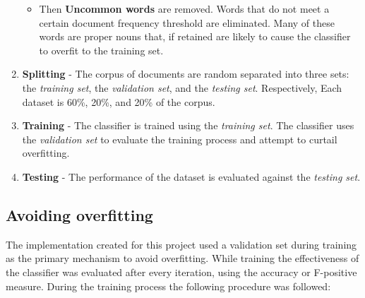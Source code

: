 \documentclass[12pt]{article}
\begin{document}
\begin{enumerate}
\begin{itemize}
            \item Then \textbf{Uncommon words} are removed. Words that do not
                meet a certain document frequency threshold are eliminated.
                Many of these words are proper nouns that, if retained are
                likely to cause the classifier to overfit to the training set.

        \end{itemize}

    \item \textbf{Splitting} - The corpus of documents are random separated
        into three sets: the \textit{training set}, the \textit{validation set},
        and the \textit{testing set}. Respectively, Each dataset is 60\%, 20\%,
        and 20\% of the corpus.

    \item \textbf{Training} - The classifier is trained using the
        \textit{training set}.  The classifier uses the \textit{validation set}
        to evaluate the training process and attempt to curtail overfitting.

    \item \textbf{Testing} - The performance of the dataset is evaluated
        against the \textit{testing set}.

\end{enumerate}

\subsection{Avoiding overfitting}

The implementation created for this project used a validation set during
training as the primary mechanism to avoid overfitting. While training the
effectiveness of the classifier was evaluated after every iteration, using the
accuracy or F-positive measure. During the training process the following
procedure was followed:
\end{document}
